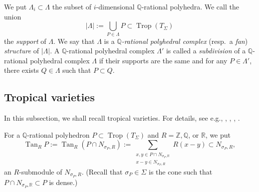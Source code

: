 \documentclass[12pt,a4]{amsart}
\def\R{\mathbb{R}}
\def\Z{\mathbb{Z}}
\def\Q{\mathbb{Q}}
\def\Tan{\mathop{\mathrm{Tan}}\nolimits}
\def\Trop{\mathop{\mathrm{trop}}\nolimits}
\def\Trop{\mathop{\mathrm{Trop}}\nolimits}
\numberwithin{equation}{section}
\numberwithin{figure}{section}
\begin{document}
  We put $\Lambda_i \subset \Lambda$ the subset of $i$-dimensional $\Q$-rational polyhedra.
  We call the union
  $$\lvert \Lambda \rvert := 
  \bigcup_{P\in\Lambda} P \subset \Trop(T_{\Sigma}) $$
  the \emph{support} of $\Lambda$.
  We say that $\Lambda$ is a \emph{$\Q$-rational polyhedral complex} (resp.\ a \emph{fan}) \emph{structure} of $\lvert \Lambda \rvert $.
  A $\Q$-rational polyhedral complex $\Lambda'$ is called a \emph{subdivision} of a $\Q$-rational polyhedral complex $\Lambda$ 
  if their supports are the same and 
  for any $P \in \Lambda'$,
  there exists  $Q \in \Lambda$
  such that $P  \subset  Q.$
  


 \subsection{Tropical varieties}\label{sub:tropical_varieties}
  In this subsection, we shall recall tropical varieties. 
   For details, see e.g., \cite{ItenbergKatzarkovMikhalkinZharkovTropicalhomology2019}, 
   \cite{MikhalkinZharkovTropicaleignewaveandintermediatejacobians2014}, 
   \cite{JellShawSmackaSuperformstropicalcohomologyandPoincarduality2019}, 
    \cite{MaclaganSturmfelsIntroductiontotropicalgeometry2015}.  

  For a $\Q$-rational polyhedron $P\subset \Trop (T_{\Sigma })$ 
    and
  $R=\Z,\Q$, or $\R$, 
  we put 
  $$\Tan_R P := \Tan_R (P \cap N_{\sigma_P,R})
     := \sum_{ \substack{ x,y\in P\cap  N_{\sigma_P, \R }
              \\
              x-y \in N_{\sigma_P, R} 
          } } R ( x-y ) \subset N_{\sigma_P,R}, $$
  an $R$-submodule of $N_{\sigma_P,R}$.
  (Recall that $\sigma_P \in \Sigma$ is the cone  such that 
  $P \cap N_{\sigma_P,\R} \subset P$ is dense.)
\end{document}
